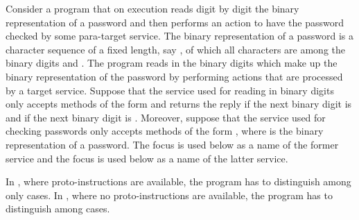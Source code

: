 \documentclass[fleqn]{llncs}
\begin{document}
\begin{example}
\label{example-password-1}
Consider a program that on execution reads digit by digit the binary
representation of a password and then performs an action to have the
password checked by some para-target service.
The binary representation of a password is a character sequence of a
fixed length, say , of which all characters are among the binary
digits  and .
The program reads in the binary digits which make up the binary
representation of the password by performing actions that are processed
by a target service.
Suppose that the service used for reading in binary digits only accepts
methods of the form  and returns the reply  if the next
binary digit is  and  if the next binary digit is .
Moreover, suppose that the service used for checking passwords only
accepts methods of the form , where  is
the binary representation of a password.
The focus  is used below as a name of the former service and
the focus  is used below as a name of the latter service.

In \PGLDdii, where proto-instructions are available, the program has to
distinguish among only  cases.
In \PGLD, where no proto-instructions are available, the program has
to distinguish among  cases.


\end{example}
\end{document}
